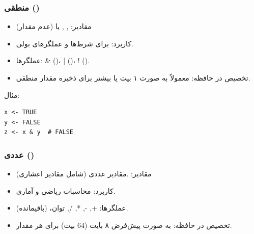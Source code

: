 \documentclass[11pt, a4paper, oneside]{book}
\begin{document}
				\subsubsection{منطقی ()}
				
					\begin{itemize}
						
						\item {\large مقادیر}:
						{\normalsize {}, , یا  (عدم مقدار)}
						
						\item {\large کاربرد}:
						{\normalsize برای شرط‌ها و عملگرهای بولی.}
						
						\item {\large عملگرها}:
						{\normalsize \& ()، | ()، ! ().}
						
						\item {\large تخصیص در حافظه}:
						{\normalsize معمولاً به صورت ۱ بیت یا بیشتر برای ذخیره مقدار منطقی.}
						
					\end{itemize}
					
					مثال:
						\begin{latin}
							\begin{lstlisting}[caption={\lr{Logical data type}}] 
x <- TRUE
y <- FALSE
z <- x & y  # FALSE

							\end{lstlisting}
						\end{latin}
					
				
				\subsubsection{عددی ()}
				
					\begin{itemize}
						
						\item {\large مقادیر}:
						{\normalsize  .مقادیر عددی (شامل مقادیر اعشاری)}
						
						\item {\large کاربرد}:
						{\normalsize محاسبات ریاضی و آماری.}
						
						\item {\large عملگرها}:
						{\normalsize +, -, *, /, توان، \lr{\%\%} (باقیمانده).}
						
						\item {\large تخصیص در حافظه}:
						{\normalsize به صورت پیش‌فرض ۸ بایت (64 بیت) برای هر مقدار.}
						
					\end{itemize}
					
\end{document}
